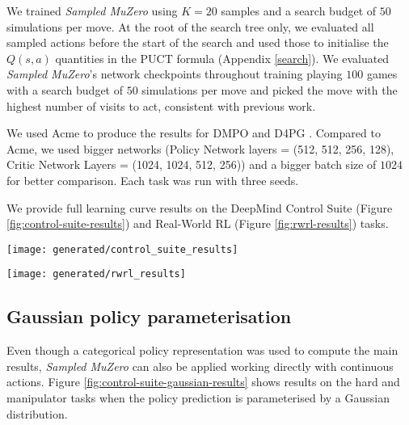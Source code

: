 \documentclass{article}
\newcommand{\smuzero}{\emph{Sampled MuZero}}
\newcommand{\dmcs}{DeepMind Control Suite }
\newcommand{\rwrl}{Real-World RL }
\begin{document}
We trained \smuzero{} using $K=20$ samples and a search budget of $50$ simulations per move. At the root of the search tree only, we evaluated all sampled actions before the start of the search and used those to initialise the $Q(s,a)$ quantities in the PUCT formula (Appendix \ref{search}). We evaluated \smuzero{}'s network checkpoints throughout training playing $100$ games with a search budget of $50$ simulations per move and picked the move with the highest number of visits to act, consistent with previous work.

We used Acme \cite{hoffman2020acme} to produce the results for DMPO \cite{hoffman2020acme} and D4PG \cite{d4pg}. Compared to Acme, we used bigger networks (Policy Network layers = (512, 512, 256, 128), Critic Network Layers = (1024, 1024, 512, 256)) and a bigger batch size of $1024$ for better comparison. Each task was run with three seeds.

We provide full learning curve results on the \dmcs (Figure \ref{fig:control-suite-results}) and \rwrl (Figure \ref{fig:rwrl-results}) tasks.

\begin{figure*}
\texttt{[image: generated/control\_suite\_results]}
\vspace*{-7mm}
\caption[]{
\label{fig:control-suite-results}
\textbf{Results in DM Control Suite tasks.} Performance of \smuzero{} (3 seeds per experiment) throughout training compared to DMPO \cite{hoffman2020acme} and D4PG \cite{d4pg}. The x-axis shows millions of environment frames, the y-axis mean episode return. Tasks are grouped into easy, medium and hard as proposed by \cite{hoffman2020acme}. Plot titles include the task name and the dimensionality of the action space.
}
\end{figure*}

\begin{figure*}
\texttt{[image: generated/rwrl\_results]}
\vspace*{-7mm}
\caption[]{
\label{fig:rwrl-results}
\textbf{\smuzero{} results for the Real-Word RL benchmark.} Performance of \smuzero{} (3 seeds per experiment) throughout training on the easy, medium and hard variations of difficulty. The x-axis shows millions of environment frames, the y-axis mean episode return. Tasks are grouped into easy, medium and hard. Plot titles include the task name.
}
\end{figure*}

\subsection{Gaussian policy parameterisation}
\label{gaussian}
Even though a categorical policy representation was used to compute the main results, \smuzero{} can also be applied working directly with continuous actions. Figure \ref{fig:control-suite-gaussian-results} shows results on the hard and manipulator tasks when the policy prediction is parameterised by a Gaussian distribution.
\end{document}
